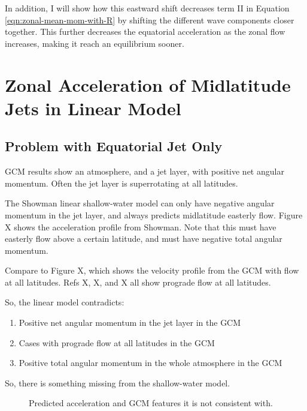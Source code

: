 In addition, I will show how this eastward shift decreases term II in Equation \ref{eqn:zonal-mean-mom-with-R} by shifting the different wave components closer together. This further decreases the equatorial acceleration as the zonal flow increases, making it reach an equilibrium sooner.




\section{Zonal Acceleration of Midlatitude Jets in Linear Model}

\subsection{Problem with Equatorial Jet Only}



GCM results show an atmosphere, and a jet layer, with positive net angular momentum. Often the jet layer is superrotating at all latitudes.

The Showman linear shallow-water model can only have negative angular momentum in the jet layer, and always predicts midlatitude easterly flow. Figure X shows the acceleration profile from Showman. Note that this must have easterly flow above a certain latitude, and must have negative total angular momentum.

Compare to Figure X, which shows the velocity profile from the GCM with flow at all latitudes. Refs X, X, and X all show prograde flow at all latitudes.

So, the linear model contradicts:

\begin{enumerate}
  \item Positive net angular momentum in the jet layer in the GCM
  \item Cases with prograde flow at all latitudes in the GCM
  \item Positive total angular momentum in the whole atmosphere in the GCM
\end{enumerate}

So, there is something missing from the shallow-water model.

\begin{figure}
  \centering
  \caption{Predicted acceleration and GCM features it is not consistent with.}
  \label{fig:day-1-tide-aci}
\end{figure}


